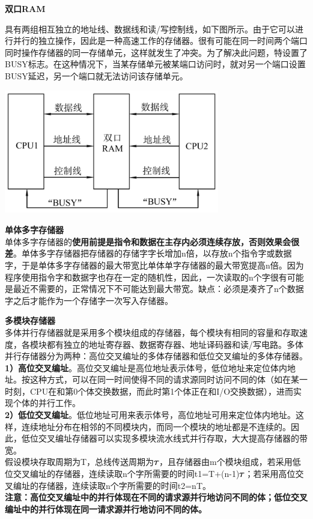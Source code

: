 \textbf{{双口RAM}}

具有两组相互独立的地址线、数据线和读/写控制线，如下图所示。由于它可以进行并行的独立操作，因此是一种高速工作的存储器。很有可能在同一时间两个端口同时操作存储器的同一存储单元，这样就发生了冲突。为了解决此问题，特设置了BUSY标志。在这种情况下，当某存储单元被某端口访问时，就对另一个端口设置BUSY延迟，另一个端口就无法访问该存储单元。

\includegraphics[width=3.69792in,height=2.12500in]{png-jpeg-pics/36B51C372D0C18E3AFC287B6D1CB8267.png}

{\textbf{单体多字存储器}}\\
单体多字存储器的\textbf{使用前提是指令和数据在主存内必须连续存放，否则效果会很差}。单体多字存储器把存储器的存储字字长增加n倍，以存放n个指令字或数据字，于是单体多字存储器的最大带宽比单体单字存储器的最大带宽提高n倍。因为程序使用指令字和数据字也存在一定的随机性，因此，一次读取的n个字很有可能是最近不需要的，正常情况下不可能达到最大带宽。{缺点：必须是凑齐了n个数据字之后才能作为一个存储字一次写入存储器。}

{\textbf{多模块存储器}}\\
多体并行存储器就是采用多个模块组成的存储器，每个模块有相同的容量和存取速度，各模块都有独立的地址寄存器、数据寄存器、地址译码器和读/写电路。多体并行存储器分为两种：高位交叉编址的多体存储器和低位交叉编址的多体存储器。\\
\textbf{1）高位交叉编址}。高位交叉编址是高位地址表示体号，低位地址来定位体内地址。按这种方式，可以在同一时间使得不同的请求源同时访问不同的体（如在某一时刻，CPU在和第0个体交换数据，而此时第1个体正在和I/O交换数据），进而实现个体的并行工作。\\
\textbf{2）低位交叉编址}。低位地址可用来表示体号，高位地址可用来定位体内地址。这样，连续地址分布在相邻的不同模块内，而同一个模块的地址都是不连续的。因此，低位交叉编址存储器可以实现多模块流水线式并行存取，大大提高存储器的带宽。\\
假设模块存取周期为T，总线传送周期为\includegraphics[width=0.09375in,height=0.07292in]{texmath/890332tau}，且存储器由m个模块组成，若采用低位交叉编址的存储器，连续读取n个字所需要的时间t1=T+(n-1)\includegraphics[width=0.09375in,height=0.07292in]{texmath/890332tau}；若采用高位交叉编址的存储器，连续读取n个字所需要的时间t2=nT。\\
\textbf{注意：高位交叉编址中的并行体现在不同的请求源并行地访问不同的体；低位交叉编址中的并行体现在同一请求源并行地访问不同的体。}
